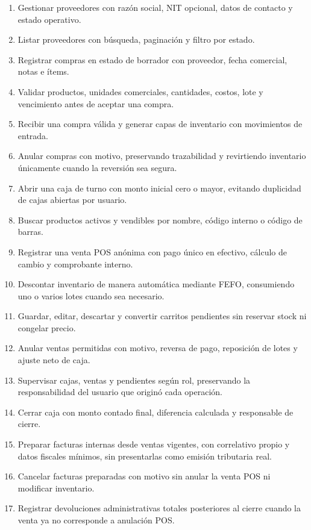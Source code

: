 \begin{enumerate}[label=\arabic*.]
  \item Gestionar proveedores con razón social, NIT opcional, datos de contacto y estado operativo.
  \item Listar proveedores con búsqueda, paginación y filtro por estado.
  \item Registrar compras en estado de borrador con proveedor, fecha comercial, notas e ítems.
  \item Validar productos, unidades comerciales, cantidades, costos, lote y vencimiento antes de aceptar una compra.
  \item Recibir una compra válida y generar capas de inventario con movimientos de entrada.
  \item Anular compras con motivo, preservando trazabilidad y revirtiendo inventario únicamente cuando la reversión sea segura.
  \item Abrir una caja de turno con monto inicial cero o mayor, evitando duplicidad de cajas abiertas por usuario.
  \item Buscar productos activos y vendibles por nombre, código interno o código de barras.
  \item Registrar una venta POS anónima con pago único en efectivo, cálculo de cambio y comprobante interno.
  \item Descontar inventario de manera automática mediante FEFO, consumiendo uno o varios lotes cuando sea necesario.
  \item Guardar, editar, descartar y convertir carritos pendientes sin reservar stock ni congelar precio.
  \item Anular ventas permitidas con motivo, reversa de pago, reposición de lotes y ajuste neto de caja.
  \item Supervisar cajas, ventas y pendientes según rol, preservando la responsabilidad del usuario que originó cada operación.
  \item Cerrar caja con monto contado final, diferencia calculada y responsable de cierre.
  \item Preparar facturas internas desde ventas vigentes, con correlativo propio y datos fiscales mínimos, sin presentarlas como emisión tributaria real.
  \item Cancelar facturas preparadas con motivo sin anular la venta POS ni modificar inventario.
  \item Registrar devoluciones administrativas totales posteriores al cierre cuando la venta ya no corresponde a anulación POS.

\end{enumerate}
